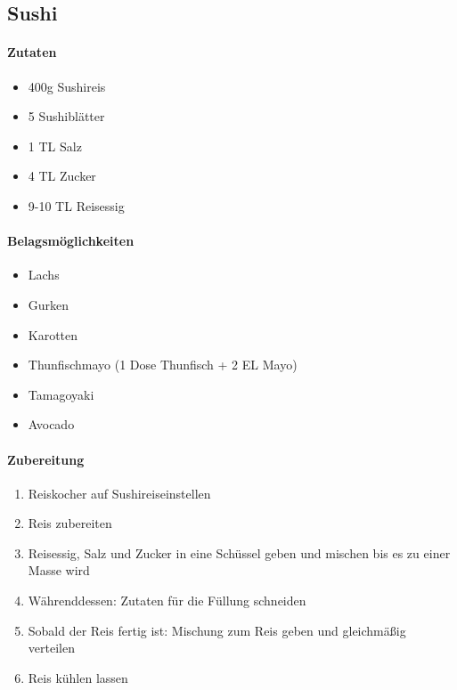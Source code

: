 
\newpage
\subsection{Sushi}
\paragraph{Zutaten}
\begin{itemize}[noitemsep]
	\item 400g Sushireis
	\item 5 Sushiblätter
	\item 1 TL Salz
	\item 4 TL Zucker
	\item 9-10 TL Reisessig
\end{itemize}
\paragraph{Belagsmöglichkeiten}
\begin{itemize}[noitemsep]
	\item Lachs
	\item Gurken
	\item Karotten
	\item Thunfischmayo (1 Dose Thunfisch + 2 EL Mayo)
	\item Tamagoyaki
	\item Avocado
\end{itemize}
\paragraph{Zubereitung}
\begin{enumerate}[noitemsep]
	\item Reiskocher auf \glqq Sushireis\grqq einstellen
	\item Reis zubereiten
	\item Reisessig, Salz und Zucker in eine Schüssel geben und mischen bis es zu einer Masse wird
	\item Währenddessen: Zutaten für die Füllung schneiden
	\item Sobald der Reis fertig ist: Mischung zum Reis geben und gleichmäßig verteilen
	\item Reis kühlen lassen
\end{enumerate}
